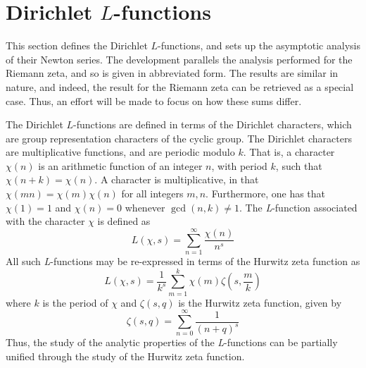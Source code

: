 \documentclass{amsart}
\begin{document}
\section{Dirichlet $L$-functions}

This section defines the Dirichlet $L$-functions, and sets up 
the asymptotic analysis of their Newton series. The development
parallels the analysis performed for the Riemann zeta, and so
is given in abbreviated form. The results are similar in nature,
and indeed, the result for the Riemann zeta can be retrieved as 
a special case.  Thus, an effort will be made to focus on how these
sums differ.

The Dirichlet $L$-functions\cite{Apostol76,Davenport80} are defined
in terms of the Dirichlet characters, which are group representation
characters of the cyclic group. 
The Dirichlet characters are multiplicative functions, and are periodic
modulo $k$. That is, a character $\chi(n)$ is an arithmetic function
of an integer $n$, with period $k$, such that $\chi(n+k)=\chi(n)$.
A character is multiplicative, in that $\chi(mn)=\chi(m)\chi(n)$
for all integers $m,n$. Furthermore, one has that $\chi(1)=1$ and
$\chi(n)=0$ whenever $\gcd(n,k)\ne1$. The \emph{L}-function associated
with the character $\chi$ is defined as \begin{equation}
L(\chi,s)=\sum_{n=1}^{\infty}\frac{\chi(n)}{n^{s}}\label{eq:}\end{equation}
 All such \emph{L}-functions may be re-expressed in terms of the Hurwitz
zeta function as
\begin{equation}
L(\chi,s)=\frac{1}{k^{s}}\sum_{m=1}^{k}\chi(m)\zeta\left(s,\frac{m}{k}\right)\label{eq:L-Hurwitz}\end{equation}
 where $k$ is the period of $\chi$ and $\zeta(s,q)$ is the Hurwitz
zeta function, given by \begin{equation}
\zeta(s,q)=\sum_{n=0}^{\infty}\frac{1}{(n+q)^{s}}\label{eq:}\end{equation}
 Thus, the study of the analytic properties of the \emph{L}-functions
can be partially unified through the study of the Hurwitz zeta function.


\end{document}
